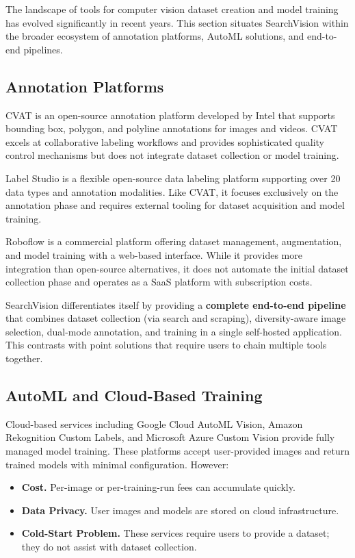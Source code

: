 \documentclass[12pt, letterpaper]{article}
\begin{document}
The landscape of tools for computer vision dataset creation and model training has evolved
significantly in recent years. This section situates SearchVision within the broader
ecosystem of annotation platforms, AutoML solutions, and end-to-end pipelines.

\subsection{Annotation Platforms}

CVAT \cite{cvat} is an open-source annotation platform developed by Intel that supports
bounding box, polygon, and polyline annotations for images and videos. CVAT excels at
collaborative labeling workflows and provides sophisticated quality control mechanisms but does
not integrate dataset collection or model training.

Label Studio \cite{labelstudio} is a flexible open-source data labeling platform supporting
over 20 data types and annotation modalities. Like CVAT, it focuses exclusively on the annotation 
phase and requires external tooling for dataset acquisition and model training.

Roboflow \cite{roboflow} is a commercial platform offering dataset management, augmentation,
and model training with a web-based interface. While it provides more integration than open-source
alternatives, it does not automate the initial dataset collection phase and operates as a
SaaS platform with subscription costs.

SearchVision differentiates itself by providing a \textbf{complete end-to-end pipeline} that 
combines dataset collection (via search and scraping), diversity-aware image selection, dual-mode 
annotation, and training in a single self-hosted application. This contrasts with point solutions 
that require users to chain multiple tools together.

\subsection{AutoML and Cloud-Based Training}

Cloud-based services including Google Cloud AutoML Vision, Amazon Rekognition Custom Labels, 
and Microsoft Azure Custom Vision provide fully managed model training. These platforms accept 
user-provided images and return trained models with minimal configuration. However:
\begin{itemize}
  \item \textbf{Cost.} Per-image or per-training-run fees can accumulate quickly.
  \item \textbf{Data Privacy.} User images and models are stored on cloud infrastructure.
  \item \textbf{Cold-Start Problem.} These services require users to provide a dataset; they 
    do not assist with dataset collection.
\end{itemize}
\end{document}
